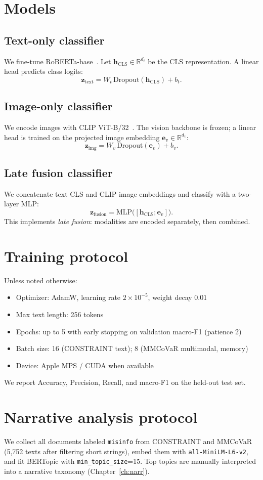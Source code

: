 \section{Models}

\subsection{Text-only classifier}
We fine-tune RoBERTa-base~\cite{liu2019roberta}.
Let $\mathbf{h}_{\mathrm{CLS}} \in \mathbb{R}^{d_t}$ be the CLS representation.
A linear head predicts class logits:
\[
\mathbf{z}_{\mathrm{text}} = W_t\,\mathrm{Dropout}(\mathbf{h}_{\mathrm{CLS}}) + b_t.
\]

\subsection{Image-only classifier}
We encode images with CLIP ViT-B/32~\cite{radford2021clip}.
The vision backbone is frozen; a linear head is trained on the projected image embedding $\mathbf{e}_v \in \mathbb{R}^{d_v}$:
\[
\mathbf{z}_{\mathrm{img}} = W_v\,\mathrm{Dropout}(\mathbf{e}_v) + b_v.
\]

\subsection{Late fusion classifier}
We concatenate text CLS and CLIP image embeddings and classify with a two-layer MLP:
\[
\mathbf{z}_{\mathrm{fusion}} = \mathrm{MLP}\big([\mathbf{h}_{\mathrm{CLS}}; \mathbf{e}_v]\big).
\]
This implements \emph{late fusion}: modalities are encoded separately, then combined.

\section{Training protocol}

Unless noted otherwise:
\begin{itemize}
  \item Optimizer: AdamW, learning rate $2\times10^{-5}$, weight decay $0.01$
  \item Max text length: 256 tokens
  \item Epochs: up to 5 with early stopping on validation macro-F1 (patience 2)
  \item Batch size: 16 (CONSTRAINT text); 8 (MMCoVaR multimodal, memory)
  \item Device: Apple MPS / CUDA when available
\end{itemize}
We report Accuracy, Precision, Recall, and macro-F1 on the held-out test set.

\section{Narrative analysis protocol}

We collect all documents labeled \texttt{misinfo} from CONSTRAINT and MMCoVaR (5{,}752 texts after filtering short strings), embed them with \texttt{all-MiniLM-L6-v2}, and fit BERTopic with \texttt{min\_topic\_size}=15.
Top topics are manually interpreted into a narrative taxonomy (Chapter~\ref{ch:narr}).
